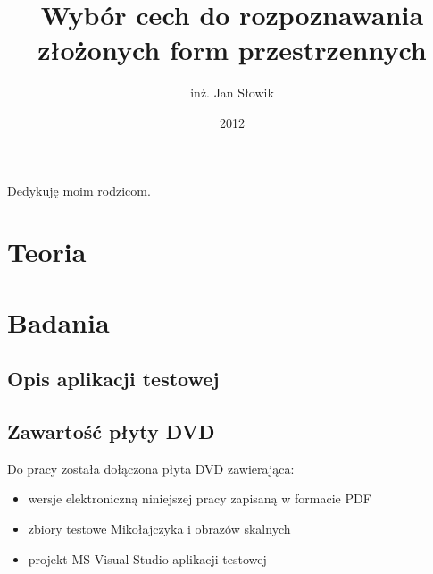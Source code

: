 \documentclass[oneside]{mgr}
\title{Wybór cech do rozpoznawania \\złożonych form przestrzennych}
\author{inż. Jan Słowik}
\date{2012}
\begin{document}
 
\maketitle 
\dedication{6cm}{Dedykuję moim rodzicom.}
\tableofcontents 


\part{Teoria}

\part{Badania}





\appendix
\chapter{Opis aplikacji testowej}
\label{dodatek_opis_aplikacji}
\chapter{Zawartość płyty DVD}
Do pracy została dołączona płyta DVD zawierająca:
\begin{itemize}
\item wersje elektroniczną niniejszej pracy zapisaną w formacie PDF
\item zbiory testowe Mikołajczyka i obrazów skalnych
\item projekt MS Visual Studio aplikacji testowej
\end{itemize}






 \listoffigures
 \listoftables
\end{document}

